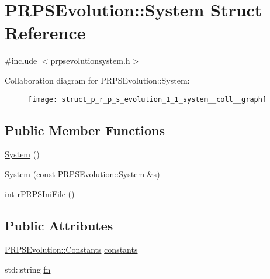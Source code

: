 \hypertarget{struct_p_r_p_s_evolution_1_1_system}{\section{\-P\-R\-P\-S\-Evolution\-:\-:\-System \-Struct \-Reference}
\label{struct_p_r_p_s_evolution_1_1_system}
}


{\ttfamily \#include $<$prpsevolutionsystem.\-h$>$}



\-Collaboration diagram for \-P\-R\-P\-S\-Evolution\-:\-:\-System\-:
\nopagebreak
\begin{figure}[H]
\begin{center}
\leavevmode
\texttt{[image: struct\_p\_r\_p\_s\_evolution\_1\_1\_system\_\_coll\_\_graph]}
\end{center}
\end{figure}
\subsection*{\-Public \-Member \-Functions}
\begin{DoxyCompactItemize}
\item 
\hyperlink{struct_p_r_p_s_evolution_1_1_system_a8d341cfd529a7698827d1b2a11ca5a2b}{\-System} ()
\item 
\hyperlink{struct_p_r_p_s_evolution_1_1_system_abcb363b5f2dddb2533fad570083cadcf}{\-System} (const \hyperlink{struct_p_r_p_s_evolution_1_1_system}{\-P\-R\-P\-S\-Evolution\-::\-System} \&s)
\item 
int \hyperlink{struct_p_r_p_s_evolution_1_1_system_a2caa4b5462af9476d68b0eb8fa7d9023}{r\-P\-R\-P\-S\-Ini\-File} ()
\end{DoxyCompactItemize}
\subsection*{\-Public \-Attributes}
\begin{DoxyCompactItemize}
\item 
\hyperlink{struct_p_r_p_s_evolution_1_1_constants}{\-P\-R\-P\-S\-Evolution\-::\-Constants} \hyperlink{struct_p_r_p_s_evolution_1_1_system_a36e61e1634d4b9340fd951c361dfad17}{constants}
\item 
std\-::string \hyperlink{struct_p_r_p_s_evolution_1_1_system_ad6ef7d4b7551ded9f3d3a3735a0b894e}{fn}
\end{DoxyCompactItemize}


